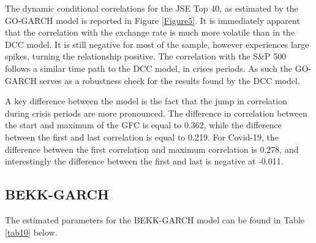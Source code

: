 \documentclass[11pt,preprint, authoryear]{elsarticle}
\numberwithin{equation}{section}
\numberwithin{figure}{section}
\numberwithin{table}{section}
\begin{document}
The dynamic conditional correlations for the JSE Top 40, as estimated by
the GO-GARCH model is reported in Figure \ref{Figure5}. It is
immediately apparent that the correlation with the exchange rate is much
more volatile than in the DCC model. It is still negative for most of
the sample, however experiences large spikes, turning the relationship
positive. The correlation with the S\&P 500 follows a similar time path
to the DCC model, in crises periods. As such the GO-GARCH serves as a
robustness check for the results found by the DCC model.

A key difference between the model is the fact that the jump in
correlation during crisis periods are more pronounced. The difference in
correlation between the start and maximum of the GFC is equal to 0.362,
while the difference between the first and last correlation is equal to
0.219. For Covid-19, the difference between the first correlation and
maximum correlation is 0.278, and interestingly the difference between
the first and last is negative at -0.011.

\hypertarget{bekk-garch-1}{%
\subsection{BEKK-GARCH}\label{bekk-garch-1}}

The estimated parameters for the BEKK-GARCH model can be found in Table
\ref{tab10} below.
\end{document}
